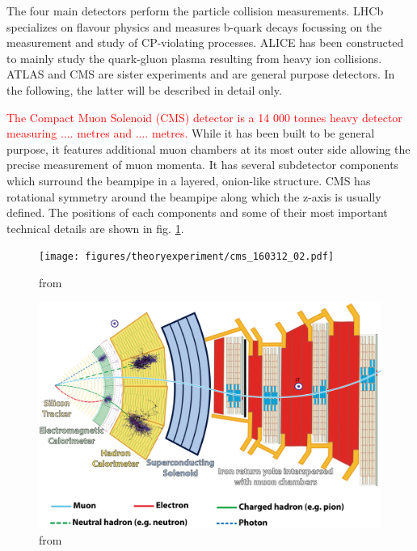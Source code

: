 The four main detectors perform the particle collision measurements. LHCb specializes on flavour physics and measures b-quark decays focussing on the measurement and study of CP-violating processes. ALICE has been constructed to mainly study the quark-gluon plasma resulting from heavy ion collisions. ATLAS and CMS are sister experiments and are general purpose detectors. In the following, the latter will be described in detail only.


\textcolor{red}{The Compact Muon Solenoid (CMS) detector is a 14 000 tonnes heavy detector measuring .... metres and .... metres.} While it has been built to be general purpose, it features additional muon chambers at its most outer side allowing the precise measurement of muon momenta. It has several subdetector components which surround the beampipe in a layered, onion-like structure. CMS has rotational symmetry around the beampipe along which the z-axis is usually defined. The positions of each components and some of their most important technical details are shown in fig. \ref{fig:cms_view}.

\begin{figure}[h!]
	\centering
	\texttt{[image: figures/theoryexperiment/cms\_160312\_02.pdf]}
	\caption{from \cite{Sakuma:2665537}}
	\label{fig:cms_view}
\end{figure}

\begin{figure}[h!]
	\centering
	\includegraphics[width=0.8\linewidth]{figures/theoryexperiment/CMS_Slice}
	\caption{from \cite{Barney:2120661}}
	\label{fig:cms_slice}
\end{figure}
